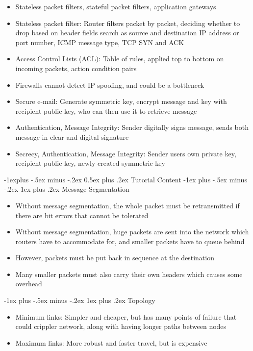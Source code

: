 \documentclass[10pt, landscape]{article}
\makeatletter
\renewcommand{\section}{\@startsection{section}{1}{0mm}%
                                {-1ex plus -.5ex minus -.2ex}%
                                {0.5ex plus .2ex}%
                                {\normalfont\large\bfseries}}
\renewcommand{\section}{\@startsection{section}{2}{0mm}%
                                {-1explus -.5ex minus -.2ex}%
                                {0.5ex plus .2ex}%
                                {\normalfont\normalsize\bfseries}}
\renewcommand{\subsection}{\@startsection{subsection}{3}{0mm}%
                                {-1ex plus -.5ex minus -.2ex}%
                                {1ex plus .2ex}%
                                {\normalfont\small\bfseries}}%
\makeatother
\begin{document}
\begin{multicols*}{3}
\begin{itemize}
    \item Stateless packet filters, stateful packet filters, application gateways
    \item Stateless packet filter: Router filters packet by packet, deciding whether to drop based on header fields search as source and destination IP address or port number, ICMP message type, TCP SYN and ACK
    \item Access Control Lists (ACL): Table of rules, applied top to bottom on incoming packets, action condition pairs
    \item Firewalls cannot detect IP spoofing, and could be a bottleneck
    \item Secure e-mail: Generate symmetric key, encrypt message and key with recipient public key, who can then use it to retrieve message
    \item Authentication, Message Integrity: Sender digitally signs message, sends both message in clear and digital signature
    \item Secrecy, Authentication, Message Integrity: Sender users own private key, recipient public key, newly created symmetric key
\end{itemize}

\section{Tutorial Content}
\subsection{Message Segmentation}
\begin{itemize}
    \item Without message segmentation, the whole packet must be retransmitted if there are bit errors that cannot be tolerated
    \item Without message segmentation, huge packets are sent into the network which routers have to accommodate for, and smaller packets have to queue behind
    \item However, packets must be put back in sequence at the destination
    \item Many smaller packets must also carry their own headers which causes some overhead
\end{itemize}
\subsection{Topology}
\begin{itemize}
    \item Minimum links: Simpler and cheaper, but has many points of failure that could crippler network, along with having longer paths between nodes
    \item Maximum links: More robust and faster travel, but is expensive
\end{itemize}

\end{multicols*}
\end{document}
